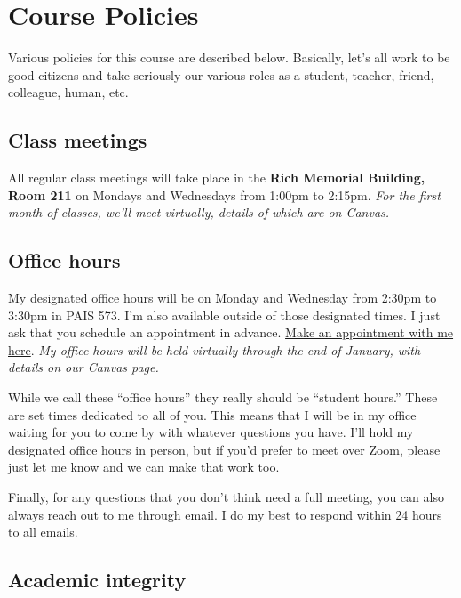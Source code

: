 \documentclass[11pt,]{article}
\begin{document}
\hypertarget{course-policies}{%
\section{Course Policies}\label{course-policies}}

Various policies for this course are described below. Basically, let's
all work to be good citizens and take seriously our various roles as a
student, teacher, friend, colleague, human, etc.

\hypertarget{class-meetings}{%
\subsection{Class meetings}\label{class-meetings}}

All regular class meetings will take place in the \textbf{Rich Memorial
Building, Room 211} on Mondays and Wednesdays from 1:00pm to 2:15pm.
\emph{For the first month of classes, we'll meet virtually, details of
which are on Canvas.}

\hypertarget{office-hours}{%
\subsection{Office hours}\label{office-hours}}

My designated office hours will be on Monday and Wednesday from 2:30pm
to 3:30pm in PAIS 573. I'm also available outside of those designated
times. I just ask that you schedule an appointment in advance.
\href{https://mccarthy-meetings.youcanbook.me/}{Make an appointment with
me here}. \emph{My office hours will be held virtually through the end
of January, with details on our Canvas page.}

While we call these ``office hours'' they really should be ``student
hours.'' These are set times dedicated to all of you. This means that I
will be in my office waiting for you to come by with whatever questions
you have. I'll hold my designated office hours in person, but if you'd
prefer to meet over Zoom, please just let me know and we can make that
work too.

Finally, for any questions that you don't think need a full meeting, you
can also always reach out to me through email. I do my best to respond
within 24 hours to all emails.

\hypertarget{academic-integrity}{%
\subsection{Academic integrity}\label{academic-integrity}}
\end{document}
